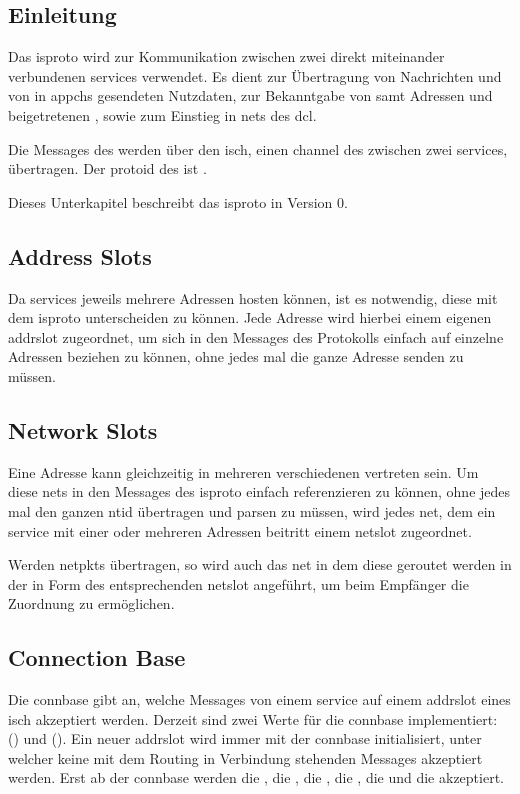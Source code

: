 
\subsection{Einleitung}
Das \gls{isproto} wird zur Kommunikation zwischen zwei direkt miteinander verbundenen \glspl{service}
verwendet. Es dient zur Übertragung von Nachrichten und von in \glspl{appch} gesendeten Nutzdaten,
zur Bekanntgabe von  samt Adressen und beigetretenen
, sowie zum Einstieg in \glspl{net} des \gls{dcl}.

Die Messages des  werden über den
\gls{isch}, einen \gls{channel} des  zwischen zwei
\glspl{service}, übertragen. Der \gls{protoid} des
 ist .

Dieses Unterkapitel beschreibt das \gls{isproto} in Version 0.

\subsection{Address Slots}
Da \glspl{service} jeweils mehrere Adressen hosten können, ist es notwendig, diese mit dem
\gls{isproto} unterscheiden zu können. Jede Adresse wird hierbei einem eigenen \gls{addrslot}
zugeordnet, um sich in den Messages des Protokolls einfach auf einzelne Adressen beziehen zu können,
ohne jedes mal die ganze Adresse senden zu müssen.

\subsection{Network Slots}
Eine Adresse kann gleichzeitig in mehreren verschiedenen  vertreten sein. Um diese
\glspl{net} in den Messages des \gls{isproto} einfach referenzieren zu können, ohne jedes mal den
ganzen \gls{ntid} übertragen und parsen zu müssen, wird jedes \gls{net}, dem ein \gls{service} mit einer
oder mehreren Adressen beitritt einem \gls{netslot} zugeordnet.

Werden \glspl{netpkt} übertragen, so wird auch das \gls{net} in dem diese geroutet werden in der
\msg{\isprotonp} in Form des entsprechenden \gls{netslot} angeführt, um beim Empfänger die Zuordnung
zu ermöglichen.

\subsection{Connection Base}
Die \gls{connbase} gibt an, welche Messages von einem \gls{service} auf einem \gls{addrslot} eines
\gls{isch} akzeptiert werden. Derzeit sind zwei Werte für die \gls{connbase} implementiert:
 () und  ().
Ein neuer \gls{addrslot} wird immer mit der \gls{connbase}  initialisiert, unter
welcher keine mit dem Routing in Verbindung stehenden Messages akzeptiert werden.
Erst ab der \gls{connbase}  werden die \msg{\isprotonjn}, die \msg{\isprotonln},
die \msg{\isprotonp}, die \msg{\isprotoireq}, die \msg{\isprotoacsa} und die \msg{\isprotoacd}
akzeptiert.


